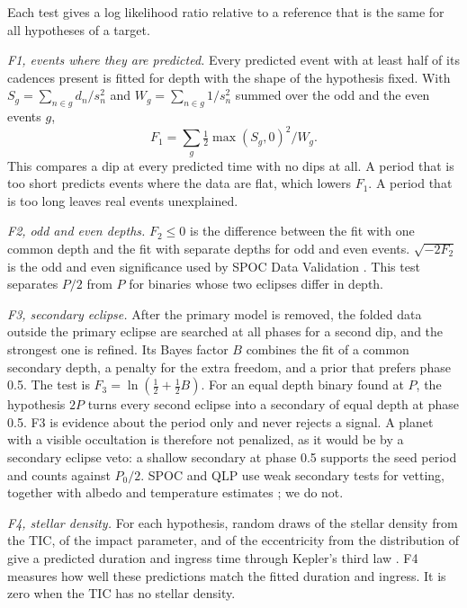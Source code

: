\documentclass[twocolumn,linenumbers]{aastex701}
\newcommand{\Pz}{P_0}
\begin{document}
Each test gives a log likelihood ratio relative to a reference that is the same for all hypotheses of a target.

\emph{F1, events where they are predicted.} Every predicted event with at least half of its cadences present is fitted for depth with the shape of the hypothesis fixed. With $S_g = \sum_{n\in g} d_n/s_n^2$ and $W_g = \sum_{n\in g} 1/s_n^2$ summed over the odd and the even events $g$,
\begin{equation}
F_1 = \sum_{g} \tfrac{1}{2}\max(S_g,0)^2 / W_g .
\end{equation}
This compares a dip at every predicted time with no dips at all. A period that is too short predicts events where the data are flat, which lowers $F_1$. A period that is too long leaves real events unexplained.

\emph{F2, odd and even depths.} $F_2 \le 0$ is the difference between the fit with one common depth and the fit with separate depths for odd and even events. $\sqrt{-2F_2}$ is the odd and even significance used by SPOC Data Validation \citep{Twicken2018}. This test separates $P/2$ from $P$ for binaries whose two eclipses differ in depth.

\emph{F3, secondary eclipse.} After the primary model is removed, the folded data outside the primary eclipse are searched at all phases for a second dip, and the strongest one is refined. Its Bayes factor $B$ combines the fit of a common secondary depth, a penalty for the extra freedom, and a prior that prefers phase 0.5. The test is $F_3 = \ln(\tfrac{1}{2} + \tfrac{1}{2}B)$. For an equal depth binary found at $P$, the hypothesis $2P$ turns every second eclipse into a secondary of equal depth at phase 0.5. F3 is evidence about the period only and never rejects a signal. A planet with a visible occultation is therefore not penalized, as it would be by a secondary eclipse veto: a shallow secondary at phase 0.5 supports the seed period and counts against $\Pz/2$. SPOC and QLP use weak secondary tests for vetting, together with albedo and temperature estimates \citep{Twicken2018,Huang2020a}; we do not.

\emph{F4, stellar density.} For each hypothesis, random draws of the stellar density from the TIC, of the impact parameter, and of the eccentricity from the distribution of \citet{Kipping2013ecc} give a predicted duration and ingress time through Kepler's third law \citep{Seager2003,Winn2010,Kipping2010}. F4 measures how well these predictions match the fitted duration and ingress. It is zero when the TIC has no stellar density.
\end{document}
